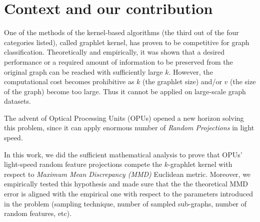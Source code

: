 \section{Context and our contribution}
One of the methods of the kernel-based algorithms (the third out of the four categories listed), called graphlet kernel, has proven to be competitive for graph classification. Theoretically and empirically, it was shown that a desired performance or a required amount of information to be preserved from the original graph can be reached with sufficiently large $k$. 
However,  the computational cost  becomes prohibitive as $k$ (the graphlet size) and/or $v$ (the size of the graph)  become too large. Thus it cannot be applied on large-scale graph datasets. 

The advent of Optical Processing Units (OPUs) opened a new horizon solving this problem, since it can apply enormous number of \emph{Random Projections} in light speed. 

In this work, we did the sufficient mathematical analysis to prove that OPUs' light-speed random feature projections compete the $k$-graphlet kernel with respect to \emph{Maximum Mean Discrepancy (MMD)} Euclidean metric. Moreover, we empirically tested this hypothesis and made sure that the the theoretical MMD error is aligned with the empirical one with respect to the parameters introduced in the problem (sampling technique, number of sampled sub-graphs, number of random features, etc). 





